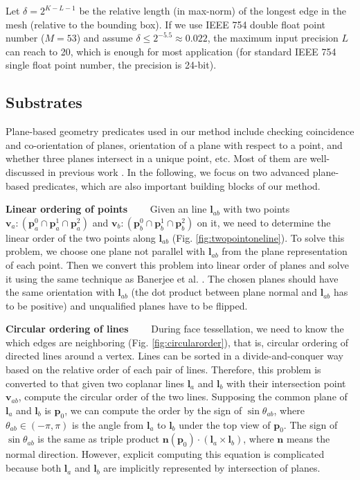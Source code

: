 \documentclass[10pt,journal,compsoc]{IEEEtran}
\begin{document}
Let $\delta = 2^{K-L-1}$ be the relative length (in max-norm) of the longest edge in the mesh (relative to the bounding box). If we use IEEE 754 double float point number ($M=53$) and assume $\delta \le 2^{-5.5} \approx 0.022$, the maximum input precision $L$ can reach to 20, which is enough for most application (for standard IEEE 754 single float point number, the precision is 24-bit).


\subsection{Substrates}
\label{sec:substrates}
Plane-based geometry predicates used in our method include checking coincidence and co-orientation of planes, orientation of a plane with respect to a point, and whether three planes intersect in a unique point, etc. Most of them are well-discussed in previous work \cite{bernstein2009fast,banerjee1996topologically}. In the following, we focus on two advanced plane-based predicates, which are also important building blocks of our method.

\vspace{0.5em}
\noindent \textbf{Linear ordering of points}~~~~
Given an line $\bm{l}_{ab}$ with two points $\bm{v}_a\colon(\bm{p}_a^0\cap\bm{p}_a^1\cap\bm{p}_a^2)$ and $\bm{v}_b\colon(\bm{p}_b^0\cap\bm{p}_b^1\cap\bm{p}_b^2)$ on it, we need to determine the linear order of the two points along $\bm{l}_{ab}$ (Fig. \ref{fig:twopointoneline}). To solve this problem, we choose one plane not parallel with $\bm{l}_{ab}$ from the plane representation of each point. Then we convert this problem into linear order of planes and solve it using the same technique as Banerjee et al. \cite{banerjee1996topologically}. The chosen planes should have the same orientation with $\bm{l}_{ab}$ (the dot product between plane normal and $\bm{l}_{ab}$ has to be positive) and unqualified planes have to be flipped.


\vspace{0.5em}
\noindent \textbf{Circular ordering of lines}~~~~
During face tessellation, we need to know the which edges are neighboring (Fig. \ref{fig:circularorder}), that is, circular ordering of directed lines around a vertex. Lines can be sorted in a divide-and-conquer way based on the relative order of each pair of lines. Therefore, this problem is converted to that given two coplanar lines $\bm{l}_a$ and $\bm{l}_b$ with their intersection point $\bm{v}_{ab}$, compute the circular order of the two lines. Supposing the common plane of $\bm{l}_a$ and $\bm{l}_b$ is $\bm{p}_0$, we can compute the order by the sign of $\sin{\theta_{ab}}$, where $\theta_{ab}\in(-\pi,\pi)$ is the angle from $\bm{l}_a$ to $\bm{l}_b$ under the top view of $\bm{p}_0$. The sign of $\sin{\theta_{ab}}$ is the same as triple product $\bm{n}(\bm{p}_0) \cdot (\bm{l}_a\times\bm{l}_b)$,
where $\bm{n}$ means the normal direction. However, explicit computing this equation is complicated because both $\bm{l}_a$ and $\bm{l}_b$ are implicitly represented by intersection of planes.
\end{document}
